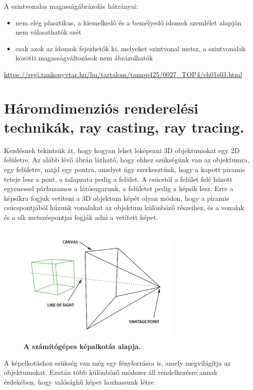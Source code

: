 \documentclass[12pt]{article}
\theoremstyle{plain}
\begin{document}
A szintvonalas magasságábrázolás hátrányai:

\begin{itemize}
   \item nem elég plasztikus, a kiemelkedő és a bemélyedő idomok szemlélet alapján nem választhatók szét
   \item csak azok az idomok fejezhetők ki, melyeket szintvonal metsz, a szintvonalak közötti magasságváltozások nem ábrázolhatók

\end{itemize}


\url{https://regi.tankonyvtar.hu/hu/tartalom/tamop425/0027\_TOP4/ch01s03.html}

\section{Háromdimenziós renderelési technikák, ray casting, ray tracing.}
Kezdésnek tekintsük át, hogy hogyan lehet leképezni 3D objektumokat egy 2D felületre. Az alább lévő ábrán látható, hogy ehhez szükségünk van az objektumra, egy felületre, majd egy pontra, amelyet úgy szerkesztünk, hogy a kapott piramis teteje lesz a pont, a talapzata pedig a felület. A csúcstól a felület felé húzott egyenessel párhuzamos a látósugarunk, a felületet pedig a képsík lesz. Erre a képsíkra fogjuk vetíteni a 3D objektum képét olyan módon, hogy a piramis csúcspontjából húzunk vonalakat az objektum különböző részeihez, és a vonalak és a sík metszéspontjai fogják adni a vetített képet.

\begin{figure}[H]
   \centering
   \includegraphics[width=8cm, height=6cm]{media/vantagepoint.png}
   \caption{\textbf{A számítógépes képalkotás alapja.}}
   \label{fig:GeneralDiagram}
\end{figure}

A képelkotáshoz szükség van még egy fényforrásra is, amely megvilágítja az objektumokat. Ezután több különböző módszer áll rendelkezésre annak érdekében, hogy valósághű képet hozhassunk létre. 
\end{document}
